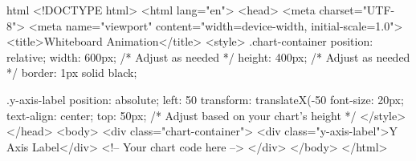 html
<!DOCTYPE html>
<html lang="en">
<head>
    <meta charset="UTF-8">
    <meta name="viewport" content="width=device-width, initial-scale=1.0">
    <title>Whiteboard Animation</title>
    <style>
        .chart-container {
            position: relative;
            width: 600px; /* Adjust as needed */
            height: 400px; /* Adjust as needed */
            border: 1px solid black;
        }

        .y-axis-label {
            position: absolute;
            left: 50%
            transform: translateX(-50%
            font-size: 20px;
            text-align: center;
            top: 50px; /* Adjust based on your chart's height */
        }
    </style>
</head>
<body>
    <div class="chart-container">
        <div class="y-axis-label">Y Axis Label</div>
        <!-- Your chart code here -->
    </div>
</body>
</html>